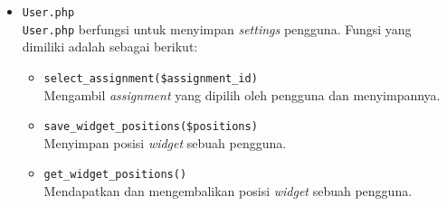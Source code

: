 \begin{itemize}
	      \begin{itemize}
		      \item \verb|get_submission($username, $assignment, $problem, $submit_id)| \\
		            Mendapatkan dan meengembalikan baris data \textit{submission} tertentu.
		      \item \verb|get_final_submissions($a_id, $u_vl, $uname, $p_num, $fil_u, $fil_prob)| \\
		            Mendapatkan dan mengembalikan seluruh \textit{final submission} pada \textit{assignment}. Pengguna yang memiliki role  \textit{student} hanya dapat melihat \textit{final submission} dirinya sendiri.
		      \item \verb|get_all_submissions($a_id, $u_vl, $uname, $p_num, $fil_u, $fil_prob)| \\
		            Mendapatakan dan mengembalikan seluruh \textit{submission} pada  \textit{assignment}. Pengguna yang memiliki role \textit{student} hanya dapat melihat \textit{submission} dirinya sendiri.
		      \item \verb|count_final_submissions($a_id, $u_vl, $uname, $fil_u, $fil_prob)| \\
		            Menghitung jumlah \textit{final submission} pada \textit{assignment}.
		      \item \verb|count_all_submissions($a_id, $u_vl, $uname, $fil_u, $fil_prob)| \\
		            Menghitung total seluruh jumlah \textit{submission} pada  \textit{assignment}.
		      \item \verb|set_final_submission($username, $assignment, $problem, $submit_id)| \\
		            Memperbaharui sebuah \textit{submission} menjadi \textit{final submission}.
		      \item \verb|add_upload_only($submit_info)| \\
		            Menyimpan hasil \textit{upload only problem} ke dalam tabel \textit{database}.
	      \end{itemize}

	\item \verb|User.php| \\
		  	\verb|User.php| berfungsi untuk menyimpan \textit{settings} pengguna. Fungsi yang dimiliki adalah sebagai berikut:
	
	      \begin{itemize}
		      \item \verb|select_assignment($assignment_id)| \\
					Mengambil \textit{assignment} yang dipilih oleh pengguna dan menyimpannya.
		      \item \verb|save_widget_positions($positions)| \\
		            Menyimpan posisi \textit{widget} sebuah pengguna.
		      \item \verb|get_widget_positions()| \\
		            Mendapatkan dan mengembalikan posisi \textit{widget} sebuah pengguna.
	      \end{itemize}


\end{itemize}
